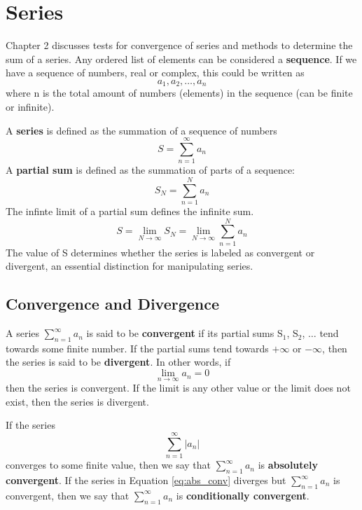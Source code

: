 \documentclass{article}
\newcommand{\be}{\begin{equation}}
\newcommand{\ee}{\end{equation}}
\begin{document}
\section*{Series}
Chapter 2 discusses tests for convergence of series and methods to determine the sum of a series.
Any ordered list of elements can be considered a \textbf{sequence}.
If we have a sequence of numbers, real or complex, this could be written as
\be
  a_1, a_2, \hdots, a_n
\ee
where n is the total amount of numbers (elements) in the sequence (can be finite or infinite). 

A \textbf{series} is defined as the summation of a sequence of numbers
\be
S=\sum_{n=1}^{\infty} a_n
\ee
A \textbf{partial sum} is defined as the summation of parts of a sequence:
\be
S_N = \sum_{n=1}^{N} a_n
\ee
The infinte limit of a partial sum defines the infinite sum.
\be
S = \lim_{N \to \infty}{S_N} = \lim_{N \to \infty} \sum_{n=1}^{N} a_n
\ee
The value of S determines whether the series is labeled as convergent or divergent, an essential distinction for manipulating series. 

\subsection*{Convergence and Divergence}
A series $\sum\limits_{n=1}^{\infty} a_n$ is said to be \textbf{convergent} if its partial sums S$_1$, S$_2$, $\hdots$ tend towards some finite number.
If the partial sums tend towards $+\infty$ or $-\infty$, then the series is said to be \textbf{divergent}.
In other words, if
\be
\lim_{n \to \infty}{a_n} = 0
\ee
then the series is convergent.
If the limit is any other value or the limit does not exist, then the series is divergent.

If the series
\be \label{eq:abs_conv}
\sum_{n=1}^{\infty} |a_n|
\ee
converges to some finite value, then we say that $\sum\limits_{n=1}^{\infty} a_n$ is \textbf{absolutely convergent}.
If the series in Equation \ref{eq:abs_conv} diverges but $\sum\limits_{n=1}^{\infty} a_n$ is convergent, then we say that $\sum\limits_{n=1}^{\infty} a_n$ is \textbf{conditionally convergent}.
\end{document}
